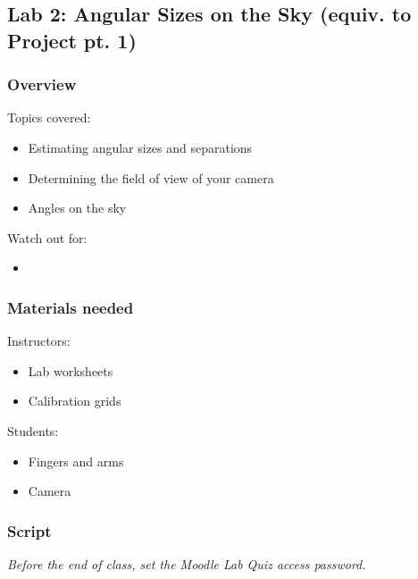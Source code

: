 \documentclass[12pt]{article}
\begin{document}
\newpage
\subsection{Lab 2: Angular Sizes on the Sky (equiv. to Project pt. 1)}

\subsubsection{Overview}

Topics covered:
\begin{itemize}
\item Estimating angular sizes and separations
\item Determining the field of view of your camera
\item Angles on the sky
\end{itemize}

\noindent
Watch out for:
\begin{itemize}
\item 
\end{itemize}


\subsubsection{Materials needed}

Instructors:
\begin{itemize}
\item Lab worksheets
\item Calibration grids
\end{itemize}

\noindent
Students:
\begin{itemize}
\item Fingers and arms
\item Camera
\end{itemize}


\subsubsection{Script}


\emph{Before the end of class, set the Moodle Lab Quiz access password.}
\end{document}
